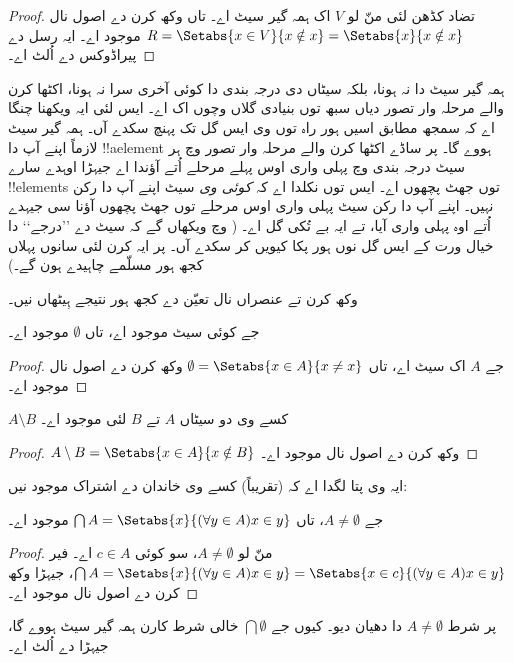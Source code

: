 \documentclass[../../../include/open-logic-section]{subfiles}
\begin{document}
\begin{proof}
تضاد کڈھن لئی منّ لو $V$ اک ہمہ گیر سیٹ اے۔ تاں وکھ کرن دے اصول نال
$R = \Setabs{x \in V}{x \notin x} = \Setabs{x}{x \notin x}$ موجود اے۔
ایہ رسل دے پیراڈوکس دے اُلٹ اے۔
\end{proof}

ہمہ گیر سیٹ دا نہ ہونا، بلکہ سیٹاں دی درجہ بندی دا کوئی آخری سرا نہ ہونا،
اکٹھا کرن والے مرحلہ وار تصور دیاں سبھ توں بنیادی گلاں وچوں اک اے۔
ایس لئی ایہ ویکھنا چنگا اے کہ سمجھ مطابق اسیں ہور راہ توں وی ایس گل
تک پہنچ سکدے آں۔ ہمہ گیر سیٹ لازماً اپنے آپ دا !!a{element} ہووے گا۔
پر ساڈے اکٹھا کرن والے مرحلہ وار تصور وچ ہر سیٹ درجہ بندی وچ پہلی واری
اوس پہلے مرحلے اُتے آؤندا اے جیہڑا اوہدے سارے !!{element}s توں جھٹ
پچھوں اے۔ ایس توں نکلدا اے کہ \emph{کوئی وی} سیٹ اپنے آپ دا رکن نہیں۔
اپنے آپ دا رکن سیٹ پہلی واری اوس مرحلے توں جھٹ پچھوں آؤنا سی جیہدے
اُتے اوہ پہلی واری آیا، تے ایہ بے تُکی گل اے۔ (
وچ ویکھاں گے کہ سیٹ دے ’’درجے‘‘ دا خیال ورت کے ایس گل نوں ہور پکا
کیویں کر سکدے آں۔ پر ایہ کرن لئی سانوں پہلاں کجھ ہور مسلّمے چاہیدے ہون گے۔)

وکھ کرن تے عنصراں نال تعیّن دے کجھ ہور نتیجے ہِیٹھاں نیں۔

\begin{prop}
جے کوئی سیٹ موجود اے، تاں $\emptyset$ موجود اے۔
\end{prop}

\begin{proof}
جے $A$ اک سیٹ اے، تاں $\emptyset = \Setabs{x \in A}{x \neq x}$
وکھ کرن دے اصول نال موجود اے۔
\end{proof}

\begin{prop}
$A \setminus B$ کسے وی دو سیٹاں $A$ تے $B$ لئی موجود اے۔
\end{prop}

\begin{proof}
$A \setminus B = \Setabs{x \in A}{x \notin B}$ وکھ کرن دے اصول نال موجود اے۔
\end{proof}

ایہ وی پتا لگدا اے کہ (تقریباً) کسے وی خاندان دے اشتراک موجود نیں:

\begin{prop}
جے $A \neq \emptyset$، تاں $\bigcap A = \Setabs{x}{(\forall y \in A)x \in y}$
موجود اے۔
\end{prop}

\begin{proof}
منّ لو $A \neq \emptyset$، سو کوئی $c \in A$ اے۔ فیر $\bigcap A =
\Setabs{x}{(\forall y \in A)x \in y} = \Setabs{x \in c}{(\forall y \in
A)x \in y}$، جیہڑا وکھ کرن دے اصول نال موجود اے۔
\end{proof}

پر شرط $A \neq \emptyset$ دا دھیان دیو۔ کیوں جے $\bigcap \emptyset$
خالی شرط کارن ہمہ گیر سیٹ ہووے گا، جیہڑا 
دے اُلٹ اے۔
\end{document}
